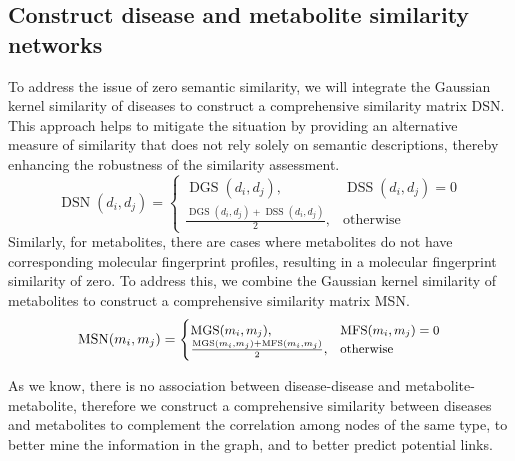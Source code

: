 \documentclass[a4paper,fleqn]{cas-dc}
\begin{document}
\subsection{Construct disease and metabolite similarity networks}
To address the issue of zero semantic similarity, we will integrate the Gaussian kernel similarity of diseases to construct a comprehensive similarity matrix DSN. This approach helps to mitigate the situation by providing an alternative measure of similarity that does not rely solely on semantic descriptions, thereby enhancing the robustness of the similarity assessment.
\begin{equation}
	\operatorname{DSN}(d_i, d_j) = \begin{cases} 
		\operatorname{DGS}(d_i, d_j), & \operatorname{DSS}(d_i, d_j) = 0 \\
		\frac{\operatorname{DGS}(d_i, d_j) + \operatorname{DSS}(d_i, d_j)}{2}, & \text{otherwise}
	\end{cases}
\end{equation}
Similarly, for metabolites, there are cases where metabolites do not have corresponding molecular fingerprint profiles, resulting in a molecular fingerprint similarity of zero. To address this, we combine the Gaussian kernel similarity of metabolites to construct a comprehensive similarity matrix MSN.
\begin{equation}
	\small
	\operatorname{MSN}(m_i, m_j) = \begin{cases} 
		\operatorname{MGS}(m_i, m_j), &\operatorname{MFS}(m_i, m_j)=0 \\
		\frac{\operatorname{MGS}(m_i, m_j) + \operatorname{MFS}(m_i, m_j)}{2}, & \text{otherwise}
	\end{cases}
\end{equation}

As we know, there is no association between disease-disease and metabolite-metabolite, therefore we construct a comprehensive similarity between diseases and metabolites to complement the correlation among nodes of the same type, to better mine the information in the graph, and to better predict potential links.
\end{document}
